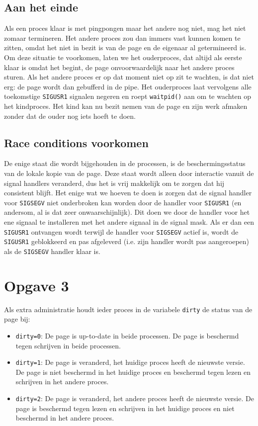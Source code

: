 \documentclass[11pt]{article}
\begin{document}
\subsection*{Aan het einde}
Als een proces klaar is met pingpongen maar het andere nog niet, mag het niet zomaar termineren. Het andere proces zou dan immers
vast kunnen komen te zitten, omdat het niet in bezit is van de page en de eigenaar al getermineerd is. Om deze situatie te voorkomen,
laten we het ouderproces, dat altijd als eerste klaar is omdat het begint, de page onvoorwaardelijk naar het andere proces sturen.
Als het andere proces er op dat moment niet op zit te wachten, is dat niet erg: de page wordt dan gebufferd in de pipe. Het ouderproces
laat vervolgens alle toekomstige \verb+SIGUSR1+ signalen negeren en roept \verb+waitpid()+ aan om te wachten op het kindproces. Het kind kan nu bezit
nemen van de page en zijn werk afmaken zonder dat de ouder nog iets hoeft te doen.

\subsection*{Race conditions voorkomen}
De enige staat die wordt bijgehouden in de processen, is de beschermingsstatus van de lokale kopie van de page. Deze staat wordt
alleen door interactie vanuit de signal handlers veranderd, dus het is vrij makkelijk om te zorgen dat hij consistent blijft. Het
enige wat we hoeven te doen is zorgen dat de signal handler voor \verb+SIGSEGV+ niet onderbroken kan worden door de handler voor
\verb+SIGUSR1+ (en andersom, al is dat zeer onwaarschijnlijk). Dit doen we door de handler voor het ene signaal te installeren met
het andere signaal in de signal mask. Als er dan een \verb+SIGUSR1+ ontvangen wordt terwijl de handler voor \verb+SIGSEGV+ actief
is, wordt de \verb+SIGUSR1+ geblokkeerd en pas afgeleverd (i.e. zijn handler wordt pas aangeroepen) als de \verb+SIGSEGV+ handler
klaar is.

\section*{Opgave 3}
Als extra administratie houdt ieder proces in de variabele \verb+dirty+ de status van de page bij:
\begin{itemize}
\item \verb+dirty=0+: De page is up-to-date in beide processen. De page is beschermd tegen schrijven in beide processen.
\item \verb+dirty=1+: De page is veranderd, het huidige proces heeft de nieuwste versie. De page is niet beschermd in het huidige proces en beschermd tegen lezen en schrijven in het andere proces.
\item \verb+dirty=2+: De page is veranderd, het andere proces heeft de nieuwste versie. De page is beschermd tegen lezen en schrijven in het huidige proces en niet beschermd in het andere proces.
\end{itemize}
\end{document}
